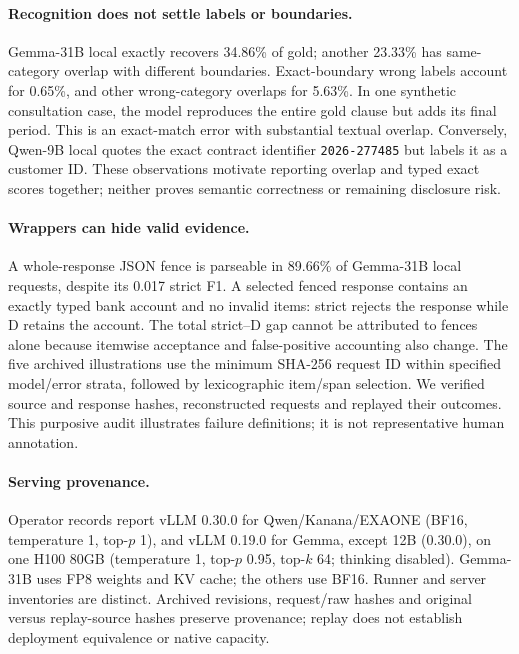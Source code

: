 \paragraph{Recognition does not settle labels or boundaries.}
Gemma-31B local exactly recovers 34.86\% of gold; another 23.33\% has
same-category overlap with different boundaries. Exact-boundary wrong
labels account for 0.65\%, and other wrong-category overlaps for 5.63\%.
In one synthetic consultation case, the model reproduces the entire gold
clause but adds its final period. This is an exact-match error with
substantial textual overlap. Conversely, Qwen-9B local quotes the exact
contract identifier \texttt{2026-277485} but labels it as a customer ID.
These observations motivate reporting overlap and typed exact scores
together; neither proves semantic correctness or remaining disclosure risk.

\paragraph{Wrappers can hide valid evidence.}
A whole-response JSON fence is parseable in 89.66\% of Gemma-31B local
requests, despite its 0.017 strict F1. A selected fenced response contains
an exactly typed bank account and no invalid items: strict rejects the
response while D retains the account. The total strict--D gap cannot be
attributed to fences alone because itemwise acceptance and false-positive
accounting also change. The five archived illustrations use the minimum
SHA-256 request ID within specified model/error strata, followed by
lexicographic item/span selection. We verified source and response hashes,
reconstructed requests and replayed their outcomes. This purposive audit
illustrates failure definitions; it is not representative human annotation.

\paragraph{Serving provenance.}
Operator records report vLLM 0.30.0 for Qwen/Kanana/EXAONE (BF16,
temperature 1, top-$p$ 1), and vLLM 0.19.0 for Gemma, except 12B (0.30.0), on one H100 80GB
(temperature 1, top-$p$ 0.95, top-$k$ 64; thinking disabled).
Gemma-31B uses FP8 weights and KV cache; the others use BF16.
Runner and server inventories are distinct. Archived revisions, request/raw
hashes and original versus replay-source hashes preserve provenance;
replay does not establish deployment equivalence or native capacity.
